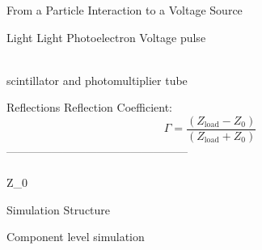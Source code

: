 \documentclass[aspectratio=169, 10pt] {beamer}
\begin{document}
    
    \begin{frame}{From a Particle Interaction to a Voltage Source}
        
        \centering
        {\Large Light \to Light \to Photoelectron \to Voltage \hspace{.4em} pulse \par} \\

        \vspace{1.5 cm}
         scintillator and photomultiplier tube  
    \end{frame}




\begin{frame}{Reflections}
    Reflection Coefficient:
$$\Gamma = \frac{(Z_{\text{load}} - Z_0)}{(Z_{\text{load}} + Z_0)}$$
 \vspace{2}
 \setlength{\fboxsep}{10pt}
 \centering{} ------------------------------------------------\\
 \uparrow \\
 Z_0
 
\end{frame}


\begin{frame}{Simulation Structure}
 \setlength{\fboxsep}{10pt}
 \centering{}      \\

 \vspace{1.5cm}

 Component level simulation
 
\end{frame}
\end{document}

